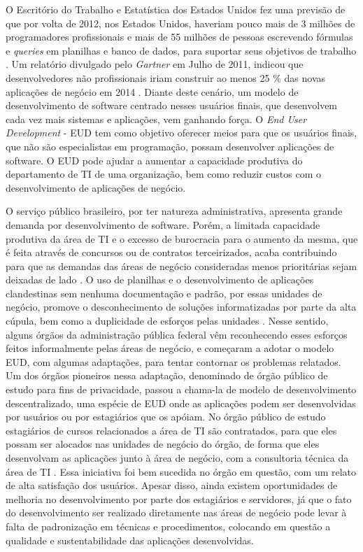 O Escritório do Trabalho e Estatística dos Estados Unidos fez uma previsão de que por volta de 2012, nos Estados Unidos, haveriam pouco mais de 3 milhões de programadores profissionais e mais de 55 milhões de pessoas escrevendo fórmulas e \textit{queries} em planilhas e banco de dados, para suportar seus objetivos de trabalho \cite{scaffidi2005}. Um relatório divulgado pelo \textit{Gartner} em Julho de 2011, indicou que desenvolvedores não profissionais iriam construir ao menos 25 \% das novas aplicações de negócio em 2014 \cite{paterno2013}. Diante deste cenário, um modelo de desenvolvimento de software centrado nesses usuários finais, que desenvolvem cada vez mais sistemas e aplicações, vem ganhando força. O \textit{End User Development} - EUD tem como objetivo oferecer meios para que os usuários finais, que não são especialistas em programação, possam desenvolver aplicações de software. O EUD pode ajudar a aumentar a capacidade produtiva do departamento de TI de uma organização, bem como reduzir custos com o desenvolvimento de aplicações de negócio.

O serviço público brasileiro, por ter natureza administrativa, apresenta grande demanda por desenvolvimento de software. Porém, a limitada capacidade produtiva da área de TI e o excesso de burocracia para o aumento da mesma, que é feita através de concursos ou de contratos terceirizados, acaba contribuindo para que as demandas das áreas de negócio consideradas menos prioritárias sejam deixadas de lado \cite{artigoTcuGovTI}. O uso de planilhas e o desenvolvimento de aplicações clandestinas sem nenhuma documentação e padrão, por essas unidades de negócio, promove o desconhecimento de soluções informatizadas por parte da alta cúpula, bem como a duplicidade de esforços pelas unidades \cite{slideTCU}. Nesse sentido, alguns órgãos da administração pública federal vêm reconhecendo esses esforços feitos informalmente pelas áreas de negócio, e começaram a adotar o modelo EUD, com algumas adaptações, para tentar contornar os problemas relatados. Um dos órgãos pioneiros nessa adaptação, denominado de órgão público de estudo para fins de privacidade, passou a chama-la de modelo de desenvolvimento descentralizado, uma espécie de EUD onde as aplicações podem ser desenvolvidas por usuários ou por estagiários que os apóiam. No órgão público de estudo estagiários de cursos relacionados a área de TI são contratados, para que eles possam ser alocados nas unidades de negócio do órgão, de forma que eles desenvolvam as aplicações junto à área de negócio, com a consultoria técnica da área de TI \cite{slideTCU}. Essa iniciativa foi bem sucedida no órgão em questão, com um relato de alta satisfação dos usuários. Apesar disso, ainda existem oportunidades de melhoria no desenvolvimento por parte dos estagiários e servidores, já que o fato do desenvolvimento ser realizado diretamente nas áreas de negócio pode levar à falta de padronização em técnicas e procedimentos, colocando em questão a qualidade e sustentabilidade das aplicações desenvolvidas.

